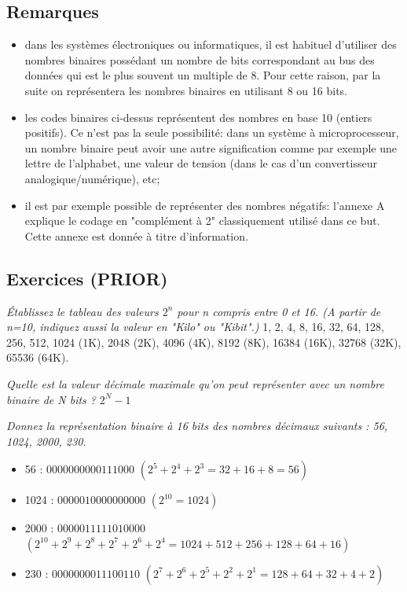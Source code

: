 \subsection{Remarques}
\begin{itemize}
\item dans les systèmes électroniques ou informatiques, il est habituel d'utiliser des nombres binaires possédant un nombre de bits correspondant au bus des données qui est le plus souvent un multiple de 8. Pour cette raison, par la suite on représentera les nombres binaires en utilisant 8 ou 16 bits.
\item les codes binaires ci-dessus représentent des nombres en base 10 (entiers positifs). Ce n'est pas la seule possibilité: dans un système à microprocesseur, un nombre binaire peut avoir une autre signification comme par exemple une lettre de l'alphabet, une valeur de tension (dans le cas d’un convertisseur analogique/numérique), etc;
\item il est par exemple possible de représenter des nombres négatifs: l'annexe A explique le codage en "complément à 2" classiquement utilisé dans ce but. Cette annexe est donnée à titre d'information.
\end{itemize}

\subsection{Exercices (PRIOR)}
\label{Exercices1}
{
\textit{Établissez le tableau des valeurs $2^n$ pour n compris entre 0 et 16. (A partir de n=10, indiquez aussi la valeur en "Kilo" ou "Kibit".)}
}
{%
1, 2, 4, 8, 16, 32, 64, 128, 256, 512, 1024 (1K), 2048 (2K), 4096 (4K), 8192 (8K), 16384 (16K), 32768 (32K), 65536 (64K).
}

{
\textit{Quelle est la valeur décimale maximale qu’on peut représenter avec un nombre binaire de N bits ?}
}
{%
$2^N-1$
}

{
\textit{Donnez la représentation binaire à 16 bits des nombres décimaux suivants : 56, 1024, 2000, 230.}
}
{%
\begin{itemize}
\item 56 :	 	$0000000000111000$ $(2^5+2^4+2^3=32+16+8=56)$
\item 1024 :	$0000010000000000$ $(2^{10}=1024)$
\item 2000 :	$0000011111010000$ $(2^{10}+2^9+2^8+2^7+2^6+2^4=1024+512+256+128+64+16)$
\item 230 :	$0000000011100110$ $(2^{7}+2^6+2^5+2^2+2^1=128+64+32+4+2)$

\end{itemize}
}

